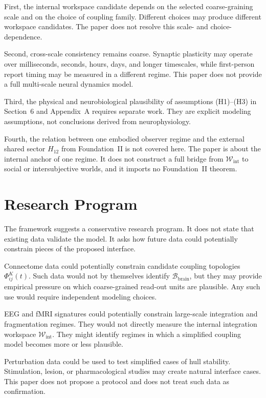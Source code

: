 \documentclass[12pt]{article}
\theoremstyle{definition}
\theoremstyle{remark}
\newcommand{\Bbrain}{\mathcal B_{\mathrm{brain}}}
\newcommand{\Wint}{\mathcal W_{\mathrm{int}}}
\begin{document}
First, the internal workspace candidate depends on the selected
coarse-graining scale and on the choice of coupling family. Different
choices may produce different workspace candidates. The paper does
not resolve this scale- and choice-dependence.

Second, cross-scale consistency remains coarse. Synaptic plasticity may
operate over milliseconds, seconds, hours, days, and longer timescales,
while first-person report timing may be measured in a different regime.
This paper does not provide a full multi-scale neural dynamics model.

Third, the physical and neurobiological plausibility of assumptions
(H1)--(H3) in Section~6 and Appendix~A requires separate work. They are
explicit modeling assumptions, not conclusions derived from
neurophysiology.

Fourth, the relation between one embodied observer regime and
the external shared sector \(H_{12}\) from Foundation~II is not covered
here. The paper is about the internal anchor of one regime. It does not
construct a full bridge from \(\Wint\) to social or intersubjective
worlds, and it imports no Foundation~II theorem.

\section{Research Program}

The framework suggests a conservative research program. It does not
state that existing data validate the model. It asks how future data
could potentially constrain pieces of the proposed interface.

Connectome data could potentially constrain candidate coupling
topologies \(\Phi_{ij}^{K}(t)\). Such data would not by themselves identify
\(\Bbrain\), but they may provide empirical pressure on which
coarse-grained read-out units are plausible. Any such use would require
independent modeling choices.

EEG and fMRI signatures could potentially constrain large-scale
integration and fragmentation regimes. They would not directly measure
the internal integration workspace \(\Wint\). They might identify regimes in which a
simplified coupling model becomes more or less plausible.

Perturbation data could be used to test simplified cases of hull
stability. Stimulation, lesion, or pharmacological studies may create
natural interface cases. This paper does not propose a protocol and
does not treat such data as confirmation.
\end{document}
